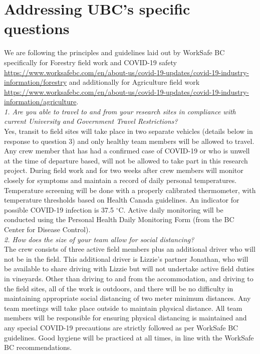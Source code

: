 \documentclass[11pt,letter]{article}
\begin{document}
\section{Addressing UBC's specific questions}
We are following the principles and guidelines laid out by WorkSafe BC specifically for Forestry field work and COVID-19 safety \url{https://www.worksafebc.com/en/about-us/covid-19-updates/covid-19-industry-information/forestry} and additionally for Agriculture field work \url{https://www.worksafebc.com/en/about-us/covid-19-updates/covid-19-industry-information/agriculture}.\\

\emph{1. Are you able to travel to and from your research sites in compliance with current University and Government Travel Restrictions?}\\
Yes, transit to field sites will take place in two separate vehicles (details below in response to question 3) and only healthy team members will be allowed to travel. Any crew member that has had a confirmed case of COVID-19 or who is unwell at the time of departure based, will not be allowed to take part in this research project. During field work and for two weeks after crew members will monitor closely for symptoms and maintain a record of daily personal temperatures. Temperature screening will be done with a properly calibrated thermometer, with temperature thresholds based on Health Canada guidelines. An indicator for possible COVID-19 infection is 37.5 $^{\circ}$C. Active daily monitoring will be conducted using the Personal Health Daily Monitoring Form (from the BC Center for Disease Control). \\
   
\emph{2. How does the size of your team allow for social distancing?}\\
The crew consists of three active field members plus an additional driver who will not be in the field. This additional driver is Lizzie's partner Jonathan, who will be available to share driving with Lizzie but will not undertake active field duties in vineyards. Other than driving to and from the accommodation, and driving to the field sites, all of the work is outdoors, and there will be no difficulty in maintaining appropriate social distancing of two meter minimum distances. Any team meetings will take place outside to maintain physical distance. All team members will be responsible for ensuring physical distancing is maintained and any special COVID-19 precautions are strictly followed as per WorkSafe BC guidelines. Good hygiene will be practiced at all times, in line with the WorkSafe BC recommendations. \\
\end{document}
